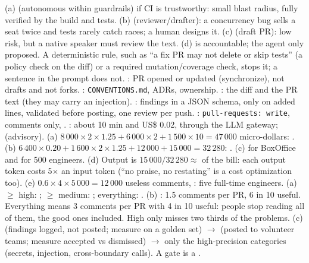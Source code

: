  (a)  (autonomous within guardrails) if CI is trustworthy: small blast radius, fully verified by the build and tests. (b)  (reviewer/drafter): a concurrency bug sells a seat twice and tests rarely catch races; a human designs it. (c)  (draft PR): low risk, but a native speaker must review the text. (d)  is accountable; the agent only proposed. A deterministic rule, such as ``a fix PR may not delete or skip tests'' (a policy check on the diff) or a required mutation/coverage check, stops it; a sentence in the prompt does not.
 : PR opened or updated (synchronize), not drafts and not forks. : \texttt{CONVENTIONS.md}, ADRs, ownership. : the diff and the PR text (they may carry an injection). : findings in a JSON schema, only on added lines, validated before posting, one review per push. : \texttt{pull-requests: write}, comments only, . : about 10 min and US\$ 0.02, through the LLM gateway;  (advisory).
 (a) $8\,000 \times 2 \times 1.25 + 6\,000 \times 2 + 1\,500 \times 10 = 47\,000$ micro-dollars: . (b) $6\,400 \times 0.20 + 1\,600 \times 2 \times 1.25 + 12\,000 + 15\,000 = 32\,280$: . (c)  for BoxOffice and  for 500 engineers. (d) Output is $15\,000/32\,280 \approx$  of the bill: each output token costs 5$\times$ an input token (``no praise, no restating'' is a cost optimization too). (e) $0.6 \times 4 \times 5\,000 = 12\,000$ useless comments, : five full-time engineers. 
 (a) $\ge$ high: ; $\ge$ medium: ; everything: . (b) : 1.5 comments per PR, 6 in 10 useful. Everything means 3 comments per PR with 4 in 10 useful: people stop reading all of them, the good ones included. High only misses two thirds of the problems. (c)  (findings logged, not posted; measure on a golden set) $\to$  (posted to volunteer teams; measure accepted vs dismissed) $\to$  only the high-precision categories (secrets, injection, cross-boundary calls). A gate is a .

